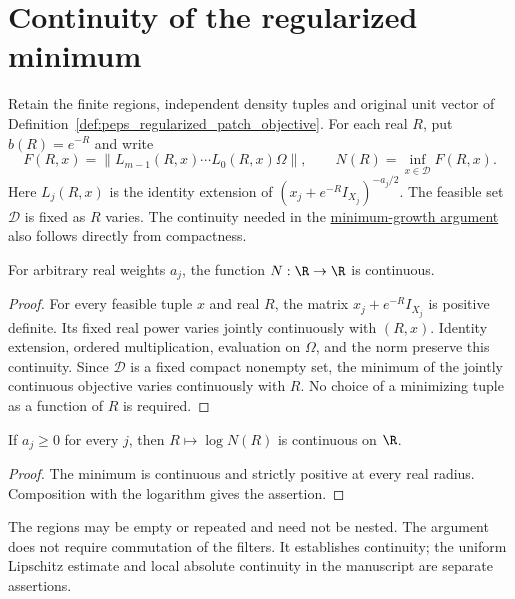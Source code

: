 \section{Continuity of the regularized minimum}
\label{sec:peps_regularized_patch_minimum_continuity}

Retain the finite regions, independent density tuples and original unit vector
of Definition~\ref{def:peps_regularized_patch_objective}. For each real $R$, put
$b(R)=e^{-R}$ and write
\[
    F(R,x)=\|L_{m-1}(R,x)\cdots L_0(R,x)\Omega\|,
    \qquad N(R)=\inf_{x\in\mathcal D}F(R,x).
\]
Here $L_j(R,x)$ is the identity extension of
$(x_j+e^{-R}I_{X_j})^{-a_j/2}$.
The feasible set $\mathcal D$ is fixed as $R$ varies.
The continuity needed in the
\href{https://github.com/openai/math/blob/adc7f1241b42e322a6451854ab7e4b4c146bf78a/preprints/Polynomial-PEPS-approximation-of-gapped-square-grid-ground-states-September-24-2026/build/sections/03-patches.tex\#L421-L466}{minimum-growth argument}
also follows directly from compactness.

\begin{lemma}
    \label{lem:peps_regularized_patch_minimum_continuous}
    \leanok
    For arbitrary real weights $a_j$, the function $N:\R\to\R$ is continuous.
\end{lemma}
\begin{proof}
    \leanok
    For every feasible tuple $x$ and real $R$, the matrix
    $x_j+e^{-R}I_{X_j}$ is positive definite. Its fixed real power varies
    jointly continuously with $(R,x)$. Identity extension, ordered
    multiplication, evaluation on $\Omega$, and the norm preserve this
    continuity. Since $\mathcal D$ is a fixed compact nonempty set, the
    minimum of the jointly continuous objective varies continuously with $R$.
    No choice of a minimizing tuple as a function of $R$ is required.
\end{proof}

\begin{corollary}
    \label{cor:peps_regularized_patch_log_minimum_continuous}
    \leanok
    If $a_j\ge0$ for every $j$, then $R\mapsto\log N(R)$ is continuous on $\R$.
\end{corollary}
\begin{proof}
    \leanok
    The minimum is continuous and strictly positive at every real radius.
    Composition with the logarithm gives the assertion.
\end{proof}

The regions may be empty or repeated and need not be nested. The argument
does not require commutation of the filters. It establishes continuity;
the uniform Lipschitz estimate and local absolute continuity in the manuscript
are separate assertions.
